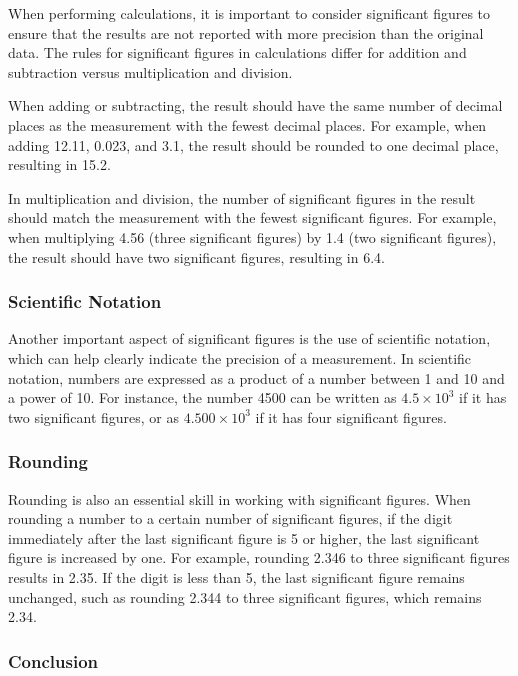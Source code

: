 \documentclass[10pt, roman]{article}
\begin{document}
When performing calculations, it is important to consider significant figures to ensure that the results are not reported with more precision than the original data.
The rules for significant figures in calculations differ for addition and subtraction versus multiplication and division.

When adding or subtracting, the result should have the same number of decimal places as the measurement with the fewest decimal places.
For example, when adding 12.11, 0.023, and 3.1, the result should be rounded to one decimal place, resulting in 15.2.

In multiplication and division, the number of significant figures in the result should match the measurement with the fewest significant figures.
For example, when multiplying 4.56 (three significant figures) by 1.4 (two significant figures), the result should have two significant figures, resulting in 6.4.

\subsubsection*{Scientific Notation}

Another important aspect of significant figures is the use of scientific notation, which can help clearly indicate the precision of a measurement.
In scientific notation, numbers are expressed as a product of a number between 1 and 10 and a power of 10.
For instance, the number 4500 can be written as \(4.5 \times 10^3\) if it has two significant figures, or as \(4.500 \times 10^3\) if it has four significant figures.

\subsubsection*{Rounding}

Rounding is also an essential skill in working with significant figures.
When rounding a number to a certain number of significant figures, if the digit immediately after the last significant figure is 5 or higher, the last significant figure is increased by one.
For example, rounding 2.346 to three significant figures results in 2.35.
If the digit is less than 5, the last significant figure remains unchanged, such as rounding 2.344 to three significant figures, which remains 2.34.

\subsubsection*{Conclusion}
\end{document}

